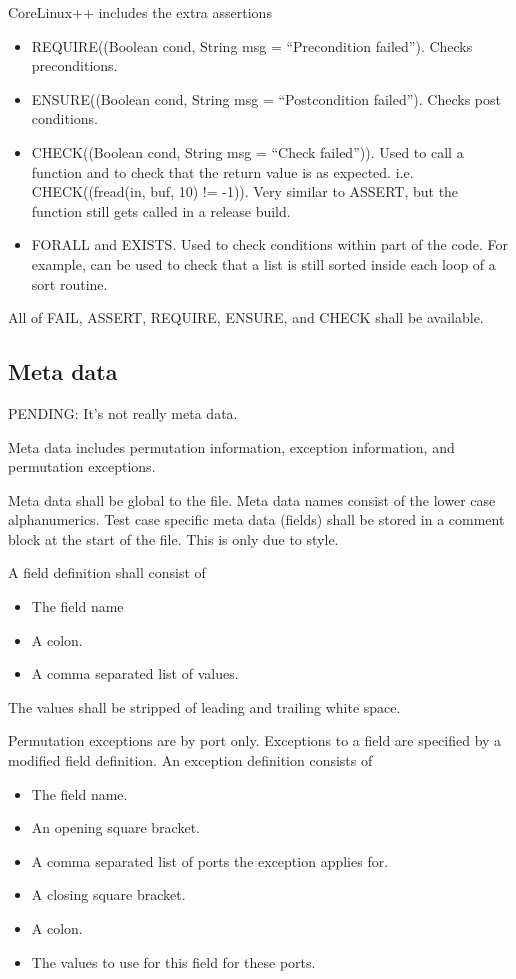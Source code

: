 \documentclass{widearticle}
\begin{document}
CoreLinux++ includes the extra assertions
\begin{itemize}
    \item REQUIRE((Boolean cond, String msg = ``Precondition
failed'').  Checks preconditions.
    \item ENSURE((Boolean cond, String msg = ``Postcondition
failed'').  Checks post conditions.
    \item CHECK((Boolean cond, String msg = ``Check failed'')).  Used
to call a function and to check that the return value is as expected.
i.e.  CHECK((fread(in, buf, 10) != -1)).  Very similar to ASSERT, but
the function still gets called in a release build.
    \item FORALL and EXISTS.  Used to check conditions within part of
the code.  For example, can be used to check that a list is still
sorted inside each loop of a sort routine.
\end{itemize}

All of FAIL, ASSERT, REQUIRE, ENSURE, and CHECK shall be available.

\subsection{Meta data}
PENDING:  It's not really meta data.

Meta data includes permutation information, exception information, and
permutation exceptions.

Meta data shall be global to the file.  Meta data names consist of the
lower case alphanumerics.  Test case specific meta data (fields) shall
be stored in a comment block at the start of the file.  This is only
due to style.  

A field definition shall consist of
\begin{itemize}
    \item The field name
    \item A colon.
    \item A comma separated list of values.
\end{itemize}

The values shall be stripped of leading and trailing white space.

Permutation exceptions are by port only.  Exceptions to a field are
specified by a modified field definition.  An exception definition
consists of 

\begin{itemize}
    \item The field name.
    \item An opening square bracket.
    \item A comma separated list of ports the exception applies for.
    \item A closing square bracket.
    \item A colon.
    \item The values to use for this field for these ports.
\end{itemize}
\end{document}
